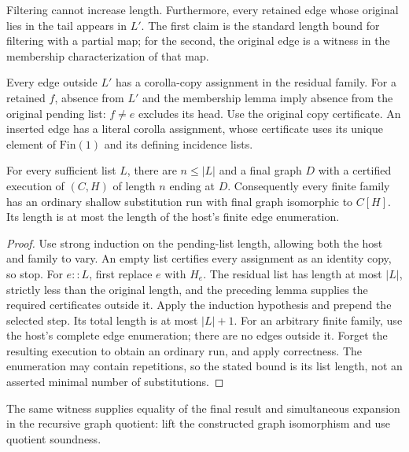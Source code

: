 Filtering cannot increase length. Furthermore, every retained edge whose
original lies in the tail appears in $L'$. The first claim is the standard
length bound for filtering with a partial map; for the second, the
original edge is a witness in the membership characterization of that map.

Every edge outside $L'$ has a corolla-copy assignment in the residual
family. For a retained $f$, absence from $L'$ and the membership lemma
imply absence from the original pending list: $f\ne e$ excludes its head.
Use the original copy certificate. An inserted edge has a literal
corolla assignment, whose certificate uses its unique element of
$\mathrm{Fin}(1)$ and its defining incidence lists.

\begin{theorem}
For every sufficient list $L$, there are $n\le |L|$ and a final graph $D$
with a certified execution of $(C,H)$ of length $n$ ending at $D$.
Consequently every finite family has an ordinary shallow substitution
run with final graph isomorphic to $C[H]$. Its length is at most the
length of the host's finite edge enumeration.
\end{theorem}
\begin{proof}
Use strong induction on the pending-list length, allowing both the host
and family to vary. An empty list certifies every assignment as an
identity copy, so stop. For $e::L$, first replace $e$ with $H_e$.
The residual list has length at most $|L|$, strictly less than the original
length, and the preceding lemma supplies the required certificates
outside it. Apply the induction hypothesis and prepend the selected
step. Its total length is at most $|L|+1$.
For an arbitrary finite family, use the host's complete edge enumeration;
there are no edges outside it. Forget the resulting execution to obtain
an ordinary run, and apply correctness. The enumeration may contain
repetitions, so the stated bound is its list length, not an asserted
minimal number of substitutions.
\end{proof}

The same witness supplies equality of the final result and simultaneous
expansion in the recursive graph quotient: lift the constructed graph
isomorphism and use quotient soundness.

